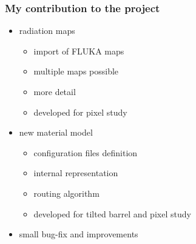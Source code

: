 \documentclass[pdftex, 11pt]{beamer}
\begin{document}

\begin{frame}
  \frametitle{My contribution to the project}
  \begin{itemize}
  \item \alert{radiation maps}
    \pause
    \begin{itemize}
    \item import of \alert{FLUKA} maps
    \item \alert{multiple} maps possible
    \item more \alert{detail}
      \pause
    \item developed for \alert{pixel} study
    \end{itemize}
    \pause
  \item new \alert{material} model
    \pause
    \begin{itemize}
    \item configuration \alert{files} definition
    \item internal \alert{representation}
    \item routing \alert{algorithm}
      \pause
    \item developed for \alert{tilted} barrel and \alert{pixel} study
    \end{itemize}
    \pause
  \item small \alert{bug-fix} and improvements
  \end{itemize}
\end{frame}
\end{document}
